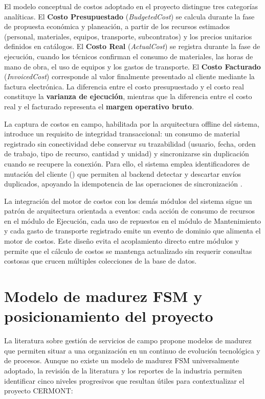 El modelo conceptual de costos adoptado en el proyecto distingue tres categorías analíticas. El \textbf{Costo Presupuestado} (\textit{BudgetedCost}) se calcula durante la fase de propuesta económica y planeación, a partir de los recursos estimados (personal, materiales, equipos, transporte, subcontratos) y los precios unitarios definidos en catálogos. El \textbf{Costo Real} (\textit{ActualCost}) se registra durante la fase de ejecución, cuando los técnicos confirman el consumo de materiales, las horas de mano de obra, el uso de equipos y los gastos de transporte. El \textbf{Costo Facturado} (\textit{InvoicedCost}) corresponde al valor finalmente presentado al cliente mediante la factura electrónica. La diferencia entre el costo presupuestado y el costo real constituye la \textbf{varianza de ejecución}, mientras que la diferencia entre el costo real y el facturado representa el \textbf{margen operativo bruto}.

La captura de costos en campo, habilitada por la arquitectura offline del sistema, introduce un requisito de integridad transaccional: un consumo de material registrado sin conectividad debe conservar su trazabilidad (usuario, fecha, orden de trabajo, tipo de recurso, cantidad y unidad) y sincronizarse sin duplicación cuando se recupere la conexión. Para ello, el sistema emplea identificadores de mutación del cliente () que permiten al backend detectar y descartar envíos duplicados, apoyando la idempotencia de las operaciones de sincronización \cite{richards2020}.

La integración del motor de costos con los demás módulos del sistema sigue un patrón de arquitectura orientada a eventos: cada acción de consumo de recursos en el módulo de Ejecución, cada uso de repuestos en el módulo de Mantenimiento y cada gasto de transporte registrado emite un evento de dominio que alimenta el motor de costos. Este diseño evita el acoplamiento directo entre módulos y permite que el cálculo de costos se mantenga actualizado sin requerir consultas costosas que crucen múltiples colecciones de la base de datos.

\section{Modelo de madurez FSM y posicionamiento del proyecto}
\label{sec:madurez-fsm}

La literatura sobre gestión de servicios de campo propone modelos de madurez que permiten situar a una organización en un continuo de evolución tecnológica y de procesos. Aunque no existe un modelo de madurez FSM universalmente adoptado, la revisión de la literatura y los reportes de la industria \cite{gartner2024,fieldaware2023} permiten identificar cinco niveles progresivos que resultan útiles para contextualizar el proyecto CERMONT:

